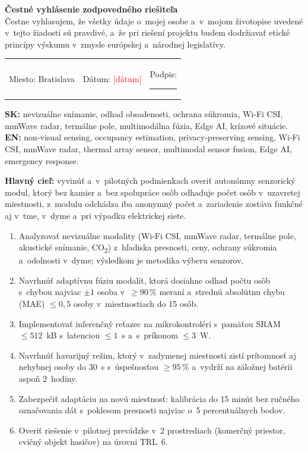 \documentclass[10pt,a4paper]{article}
\newcommand{\doplnit}[1]{\textcolor{red}{[#1]}}
\newcommand{\cast}[1]{\vspace{8pt}{\large\bfseries #1}\par\vspace{2pt}}
\newcommand{\podcast}[1]{\vspace{6pt}\rowcolors{1}{}{}{\bfseries #1}\par}
\begin{document}
\medskip
\textbf{Čestné vyhlásenie zodpovedného riešiteľa}\\
Čestne vyhlasujem, že všetky údaje o~mojej osobe a~v~mojom životopise uvedené v~tejto žiadosti sú pravdivé, a~že pri riešení projektu budem dodržiavať etické princípy výskumu v~zmysle európskej a~národnej legislatívy.

\medskip
\begin{tabular}{@{}p{5cm}p{5cm}p{5cm}@{}}
Miesto: Bratislava & Dátum: \doplnit{dátum} & Podpis: \rule{3.5cm}{0.4pt}
\end{tabular}

\newpage
\cast{VV-B -- Ciele, zámery a~výstupy projektu}

\podcast{01 Kľúčové slová}
\textbf{SK:} nevizuálne snímanie, odhad obsadenosti, ochrana súkromia, Wi-Fi CSI, mmWave radar, termálne pole, multimodálna fúzia, Edge AI, krízové situácie.\\
\textbf{EN:} non-visual sensing, occupancy estimation, privacy-preserving sensing, Wi-Fi CSI, mmWave radar, thermal array sensor, multimodal sensor fusion, Edge AI, emergency response.

\podcast{02 Ciele projektu}
\textbf{Hlavný cieľ:} vyvinúť a~v~pilotných podmienkach overiť autonómny senzorický modul, ktorý bez kamier a~bez spolupráce osôb odhaduje počet osôb v~uzavretej miestnosti, z~modulu odchádza iba anonymný počet a~zariadenie zostáva funkčné aj v~tme, v~dyme a~pri výpadku elektrickej siete.

\begin{enumerate}[label=\textbf{C\arabic*:},leftmargin=*,itemsep=1pt]
\item Analyzovať nevizuálne modality (Wi-Fi CSI, mmWave radar, termálne pole, akustické snímanie, CO\textsubscript{2}) z~hľadiska presnosti, ceny, ochrany súkromia a~odolnosti v~dyme; výsledkom je metodika výberu senzorov.
\item Navrhnúť adaptívnu fúziu modalít, ktorá dosiahne odhad počtu osôb s~chybou najviac $\pm 1$ osoba v~$\geq 90$\,\% meraní a~strednú absolútnu chybu (MAE) $\leq 0{,}5$ osoby v~miestnostiach do 15 osôb.
\item Implementovať inferenčný reťazec na mikrokontroléri s~pamäťou SRAM $\leq 512$~kB s~latenciou $\leq 1$~s a~s~príkonom $\leq 3$~W.
\item Navrhnúť havarijný režim, ktorý v~zadymenej miestnosti zistí prítomnosť aj nehybnej osoby do 30~s s~úspešnosťou $\geq 95$\,\% a~vydrží na záložnej batérii aspoň 2~hodiny.
\item Zabezpečiť adaptáciu na novú miestnosť: kalibrácia do 15 minút bez ručného označovania dát s~poklesom presnosti najviac o~5 percentuálnych bodov.
\item Overiť riešenie v~pilotnej prevádzke v~2 prostrediach (komerčný priestor, cvičný objekt hasičov) na úrovni TRL~6.
\end{enumerate}
\end{document}
